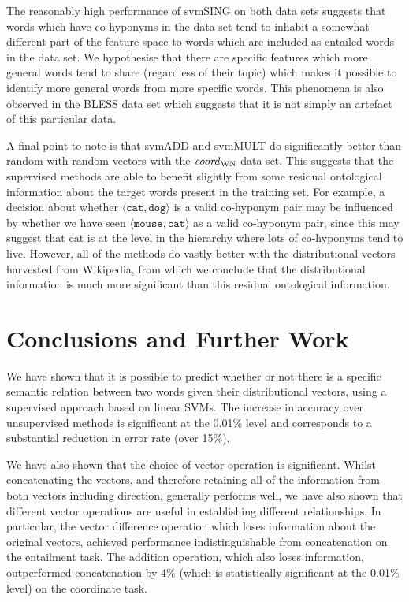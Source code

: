 \documentclass[11pt]{article}
\newcommand\coordWN{\mbox{\em coord\/}_{\mbox{\scriptsize WN}}}
\begin{document}
The reasonably high performance of svmSING on both data sets suggests that words which have co-hyponyms in the data set tend to inhabit a somewhat different part of the feature space to words which are included as entailed words in the data set.  We hypothesise that there are specific features which more general words tend to share (regardless of their topic) which makes it possible to identify more general words from more specific words.  This phenomena is also observed in the BLESS data set which suggests that it is not simply an artefact of this particular data.

A final point to note is that svmADD and svmMULT  do significantly better than random with random vectors with the $\coordWN$ data set.  This suggests that the supervised methods are able to benefit slightly from some residual ontological information about the target words present in the training set.  For example, a decision about whether $\langle\texttt{cat},\texttt{dog}\rangle$ is a valid co-hyponym pair may be influenced by whether we have seen $\langle\texttt{mouse},\texttt{cat}\rangle$ as a valid co-hyponym pair, since this may suggest that cat is at the level in the hierarchy where lots of co-hyponyms tend to live.  However, all of the methods do vastly better with the distributional vectors harvested from Wikipedia, from which we conclude that the distributional information is much more significant than this residual ontological information.

\section{Conclusions and Further Work}

We have shown that it is possible to predict whether
or not there is a specific semantic relation between two words given
their distributional vectors, using a supervised approach based on linear SVMs. The   increase in accuracy over unsupervised methods is significant at the 0.01\% level and corresponds to a substantial reduction in error rate (over 15\%).

We have also shown that the choice of vector operation is significant.  Whilst concatenating the vectors, and therefore retaining all of the information from both vectors including direction, generally performs well, we have also shown that different vector operations are useful in establishing different relationships.  In particular, the vector difference operation which loses information about the original vectors, achieved performance indistinguishable from concatenation on the entailment task.  The addition operation, which also loses information, outperformed concatenation by 4\% (which is statistically significant at the 0.01\% level) on the coordinate task.
\end{document}
